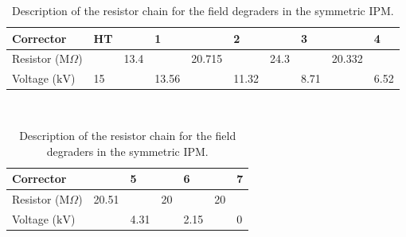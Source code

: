 \begin{table}[ht]
  \centering
  \caption[Description of the resistor chain for the field degraders in the symmetric IPM]
  {Description of the resistor chain for the field degraders in the symmetric IPM.}
  \label{chap3:resistor_sym}
  \begin{tabular}{llllllllll}
    \toprule
    Corrector                       & HT  &      & 1     &        & 2     &      & 3    &        & 4           \\
    \midrule
    Resistor (\(\mathrm{M}\Omega\)) &    & 13.4 &       & 20.715 &       & 24.3 &      & 20.332 \\
    Voltage (\(\mathrm{kV}\))       & 15 &      & 13.56 &        & 11.32 &      & 8.71 &        & 6.52\\
    \bottomrule
  \end{tabular}
  \\
  \medskip
  \begin{tabular}{lllllll}
    \toprule
    Corrector                      & & 5 & & 6 &  & 7  \\
    \midrule
    Resistor (\(\mathrm{M}\Omega\))& 20.51 &  & 20  &  & 20 \\
    Voltage (\(\mathrm{kV}\))      & & 4.31 & & 2.15 &  & 0  \\
    \bottomrule
  \end{tabular}

\end{table}